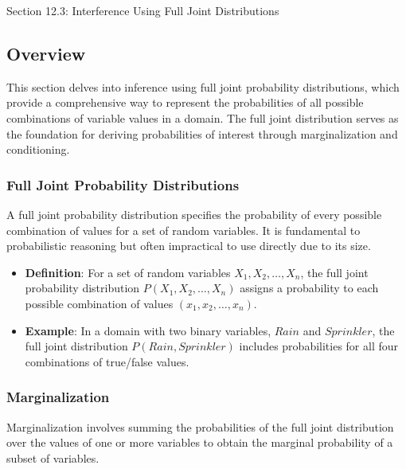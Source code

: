 \begin{notes}{Section 12.3: Interference Using Full Joint Distributions}
    \subsection*{Overview}

    This section delves into inference using full joint probability distributions, which provide a comprehensive way to represent the probabilities of all possible combinations of variable values in a 
    domain. The full joint distribution serves as the foundation for deriving probabilities of interest through marginalization and conditioning.
    
    \subsubsection*{Full Joint Probability Distributions}
    
    A full joint probability distribution specifies the probability of every possible combination of values for a set of random variables. It is fundamental to probabilistic reasoning but often impractical 
    to use directly due to its size.
    
    \begin{highlight}
    
        \begin{itemize}
            \item \textbf{Definition}: For a set of random variables $X_1, X_2, \ldots, X_n$, the full joint probability distribution $P(X_1, X_2, \ldots, X_n)$ assigns a probability to each possible 
            combination of values $(x_1, x_2, \ldots, x_n)$.
            \item \textbf{Example}: In a domain with two binary variables, $Rain$ and $Sprinkler$, the full joint distribution $P(Rain, Sprinkler)$ includes probabilities for all four combinations of 
            true/false values.
        \end{itemize}
    
    \end{highlight}
    
    \subsubsection*{Marginalization}
    
    Marginalization involves summing the probabilities of the full joint distribution over the values of one or more variables to obtain the marginal probability of a subset of variables.
    

\end{notes}
